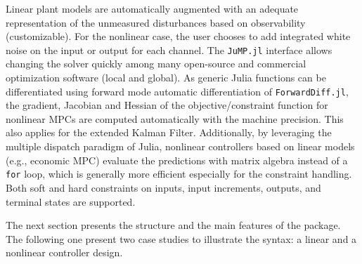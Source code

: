 Linear plant models are automatically augmented with an adequate representation of the unmeasured disturbances based on observability (customizable). For the nonlinear case, the user chooses to add integrated white noise on the input or output for each channel. The \texttt{JuMP.jl} interface allows changing the solver quickly among  many open-source and commercial optimization software (local and global). As generic Julia functions can be differentiated using forward mode automatic differentiation of \texttt{ForwardDiff.jl}, the gradient, Jacobian and Hessian of the objective/constraint function for nonlinear MPCs are computed automatically with the machine precision. This also applies for the extended Kalman Filter. Additionally, by leveraging the multiple dispatch paradigm of Julia, nonlinear controllers based on linear models (e.g., economic MPC) evaluate the predictions with matrix algebra instead of a \texttt{for} loop, which is generally more efficient especially for the constraint handling. Both soft and hard constraints on inputs, input increments, outputs, and terminal states are supported.

The next section presents the structure and the main features of the package. The following one present two case studies to illustrate the syntax: a linear and a nonlinear controller design.